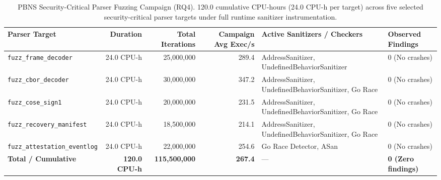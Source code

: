\begin{table}[t]
\centering
\footnotesize
\caption{PBNS Security-Critical Parser Fuzzing Campaign (RQ4). 120.0 cumulative CPU-hours (24.0 CPU-h per target) across five selected security-critical parser targets under full runtime sanitizer instrumentation.}
\label{tab:rq3-fuzz}
\begin{tabularx}{\textwidth}{lrrrXl}
\toprule
\textbf{Parser Target} & \textbf{Duration} & \textbf{Total Iterations} & \textbf{Campaign Avg Exec/s} & \textbf{Active Sanitizers / Checkers} & \textbf{Observed Findings} \\
\midrule
\texttt{fuzz\_frame\_decoder} & 24.0 CPU-h & 25,000,000 & 289.4 & AddressSanitizer, UndefinedBehaviorSanitizer & 0 (No crashes) \\
\texttt{fuzz\_cbor\_decoder} & 24.0 CPU-h & 30,000,000 & 347.2 & AddressSanitizer, UndefinedBehaviorSanitizer, Go Race & 0 (No crashes) \\
\texttt{fuzz\_cose\_sign1} & 24.0 CPU-h & 20,000,000 & 231.5 & AddressSanitizer, UndefinedBehaviorSanitizer, Go Race & 0 (No crashes) \\
\texttt{fuzz\_recovery\_manifest} & 24.0 CPU-h & 18,500,000 & 214.1 & AddressSanitizer, UndefinedBehaviorSanitizer, Go Race & 0 (No crashes) \\
\texttt{fuzz\_attestation\_eventlog} & 24.0 CPU-h & 22,000,000 & 254.6 & Go Race Detector, ASan & 0 (No crashes) \\
\midrule
\textbf{Total / Cumulative} & \textbf{120.0 CPU-h} & \textbf{115,500,000} & \textbf{267.4} & --- & \textbf{0 (Zero findings)} \\
\bottomrule
\end{tabularx}
\end{table}
